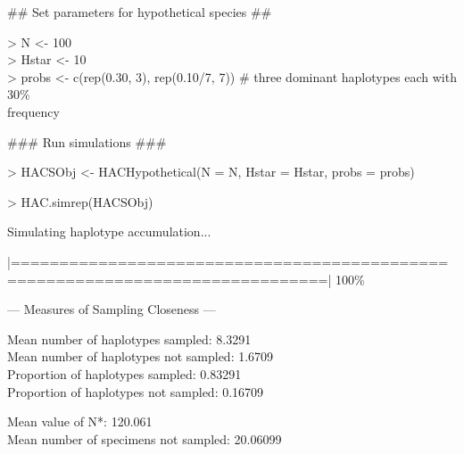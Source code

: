 {\tt \scriptsize

\vspace{1mm}

{\noindent \#\# Set parameters for hypothetical species \#\#}

\vspace{1mm}

{\noindent > N <- 100} \\
{> Hstar <- 10} \\
{> probs <- c(rep(0.30, 3), rep(0.10/7, 7)) \# three dominant haplotypes each with 30\% \\ frequency}

\vspace{2mm}

{\noindent \#\#\# Run simulations \#\#\#}

\vspace{1mm}

{\noindent > HACSObj <- HACHypothetical(N = N, Hstar = Hstar, probs = probs)}

\vspace{1mm}

{\noindent > HAC.simrep(HACSObj)} 

\vspace{1mm}

\noindent Simulating haplotype accumulation...

\vspace{2mm}
 
\noindent |==============================================================================| 100\%
  
\vspace{3mm}
 
\noindent --- Measures of Sampling Closeness ---

\vspace{2mm} 
 
\noindent Mean number of haplotypes sampled: 8.3291 \\
Mean number of haplotypes not sampled: 1.6709 \\
Proportion of haplotypes sampled: 0.83291 \\
Proportion of haplotypes not sampled: 0.16709  

\vspace{2mm} 
 
\noindent Mean value of N*: 120.061 \\
Mean number of specimens not sampled: 20.06099

\vspace{3mm}
 
}
